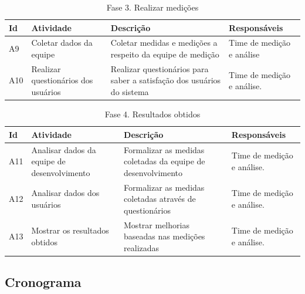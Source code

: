 \begin{table}[H]
\centering
\begin{tabular}{|p{1cm}|p{2cm}|p{5cm}|p{3cm}|}
\hline
	\textbf{Id} &
	\textbf{Atividade} &
	\textbf{Descrição} &
  \textbf{Responsáveis}
	\\ \hline
	A9 &
Coletar dados da equipe &
	Coletar medidas e medições a respeito da equipe de medição &
Time de medição e análise
	\\ \hline
	A10 &
	Realizar questionários dos usuários &
Realizar questionários para saber a satisfação dos usuários do sistema &
Time de medição e análise.
		\\ \hline
\end{tabular}
\caption{Fase 3. Realizar medições}
\label{tab:atividades_fase_3}
\end{table}

\begin{table}[H]
\centering
\begin{tabular}{|p{1cm}|p{2cm}|p{5cm}|p{3cm}|}
\hline
	\textbf{Id} &
	\textbf{Atividade} &
	\textbf{Descrição} &
  \textbf{Responsáveis}
	\\ \hline
	A11 &
	Analisar dados da equipe de desenvolvimento &
	Formalizar as medidas coletadas da equipe de desenvolvimento &
Time de medição e análise.
	\\ \hline
	A12 &
Analisar dados dos usuários &
  Formalizar as medidas coletadas através de questionários &
Time de medição e análise.
	\\ \hline
	A13 &
Mostrar os resultados obtidos &
	Mostrar melhorias baseadas nas medições realizadas &
Time de medição e análise.
	\\ \hline
\end{tabular}
\caption{Fase 4. Resultados obtidos}
\label{tab:atividades_fase_4}
\end{table}

\subsection{Cronograma}

